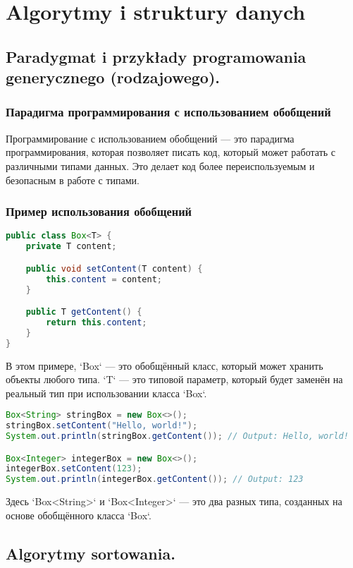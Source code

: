 \chapter{Algorytmy i struktury danych}
\section{Paradygmat i przykłady programowania generycznego (rodzajowego). }


\subsection*{Парадигма программирования с использованием обобщений}

Программирование с использованием обобщений — это парадигма программирования, которая позволяет писать код, который может работать с различными типами данных. Это делает код более переиспользуемым и безопасным в работе с типами.

\subsection*{Пример использования обобщений}

\begin{lstlisting}[language=Java]
public class Box<T> {
    private T content;

    public void setContent(T content) {
        this.content = content;
    }

    public T getContent() {
        return this.content;
    }
}
\end{lstlisting}

В этом примере, `Box` — это обобщённый класс, который может хранить объекты любого типа. `T` — это типовой параметр, который будет заменён на реальный тип при использовании класса `Box`.

\begin{lstlisting}[language=Java]
Box<String> stringBox = new Box<>();
stringBox.setContent("Hello, world!");
System.out.println(stringBox.getContent()); // Output: Hello, world!

Box<Integer> integerBox = new Box<>();
integerBox.setContent(123);
System.out.println(integerBox.getContent()); // Output: 123
\end{lstlisting}

Здесь `Box<String>` и `Box<Integer>` — это два разных типа, созданных на основе обобщённого класса `Box`.

\section{Algorytmy sortowania. }

